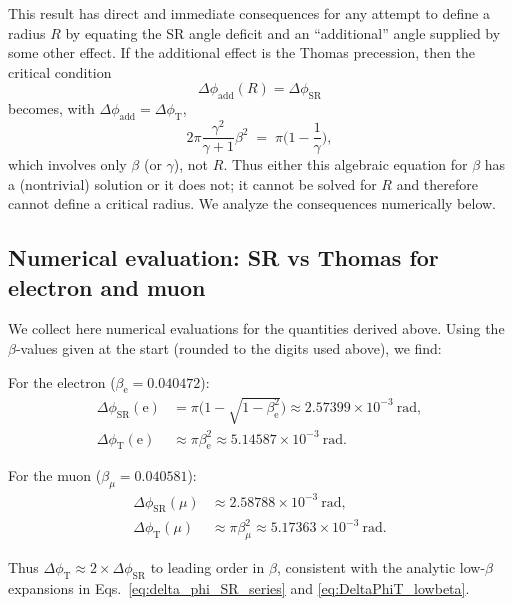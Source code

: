 \documentclass[%
 reprint,
 amsmath,amssymb,
 aps,
]{revtex4-1}
\numberwithin{equation}{section}%
\begin{document}
This result has direct and immediate consequences for any attempt to define a radius $R$ by equating the SR angle deficit and an ``additional'' angle supplied by some other effect. If the additional effect is the Thomas precession, then the critical condition
\begin{equation}
\Delta\phi_{\mathrm{add}}(R)=\Delta\phi_{\mathrm{SR}}
\label{eq:crit_general}
\end{equation}
becomes, with $\Delta\phi_{\mathrm{add}}=\Delta\phi_{\mathrm{T}}$,
\begin{equation}
2\pi\frac{\gamma^{2}}{\gamma+1}\beta^{2} \;=\; \pi\Big(1-\frac{1}{\gamma}\Big),
\label{eq:crit_thomas_eq}
\end{equation}
which involves only $\beta$ (or $\gamma$), not $R$. Thus either this algebraic equation for $\beta$ has a (nontrivial) solution or it does not; it cannot be solved for $R$ and therefore cannot define a critical radius. We analyze the consequences numerically below.

\subsection{Numerical evaluation: SR vs Thomas for electron and muon}

We collect here numerical evaluations for the quantities derived above. Using the $\beta$-values given at the start (rounded to the digits used above), we find:

For the electron ($\beta_{\mathrm{e}}=0.040472$):
\begin{align}
\Delta\phi_{\mathrm{SR}}(\mathrm{e}) &= \pi\Big(1-\sqrt{1-\beta_{\mathrm{e}}^{2}}\Big)
\approx 2.57399\times 10^{-3}\ \mathrm{rad},
\label{eq:num_SR_e}
\\
\Delta\phi_{\mathrm{T}}(\mathrm{e}) &\approx \pi\beta_{\mathrm{e}}^{2}
\approx 5.14587\times 10^{-3}\ \mathrm{rad}.
\label{eq:num_T_e}
\end{align}

For the muon ($\beta_{\mu}=0.040581$):
\begin{align}
\Delta\phi_{\mathrm{SR}}(\mu) &\approx 2.58788\times 10^{-3}\ \mathrm{rad},
\label{eq:num_SR_mu}
\\
\Delta\phi_{\mathrm{T}}(\mu) &\approx \pi\beta_{\mu}^{2} \approx 5.17363\times 10^{-3}\ \mathrm{rad}.
\label{eq:num_T_mu}
\end{align}

Thus $\Delta\phi_{\mathrm{T}}\approx 2\times\Delta\phi_{\mathrm{SR}}$ to leading order in $\beta$, consistent with the analytic low-$\beta$ expansions in Eqs.~\eqref{eq:delta_phi_SR_series} and \eqref{eq:DeltaPhiT_lowbeta}.
\end{document}
